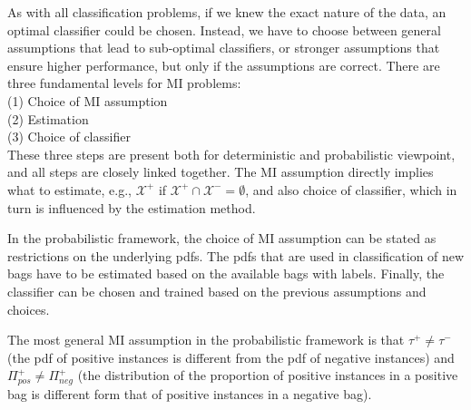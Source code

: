 As with all classification problems, if we knew the exact nature of the data, an optimal classifier could be chosen. 
Instead, we have to choose between general assumptions that lead to sub-optimal classifiers, or stronger assumptions that ensure higher performance, but only if the assumptions are correct. 
There are three fundamental levels for MI problems: \\
(1) Choice of MI assumption \\
(2) Estimation \\
(3) Choice of classifier \\
These three steps are present both for deterministic and probabilistic viewpoint, and all steps are closely linked together.
The MI assumption directly implies what to estimate, e.g., $\mathcal{X}^+$ if $\mathcal{X}^+ \cap \mathcal{X}^- = \emptyset$, and also choice of classifier, which in turn is influenced by the estimation method. 

In the probabilistic framework, the choice of MI assumption can be stated as restrictions on the underlying pdfs. 
The pdfs that are used in classification of new bags have to be estimated based on the available bags with labels. 
Finally, the classifier can be chosen and trained based on the previous assumptions and choices. 

The most general MI assumption in the probabilistic framework is that $\tau^+ \neq \tau^-$ (the pdf of positive instances is different from the pdf of negative instances) and $\Pi_{pos}^+ \neq \Pi_{neg}^+$ (the distribution of the proportion of positive instances in a positive bag is different form that of positive instances in a negative bag). 










